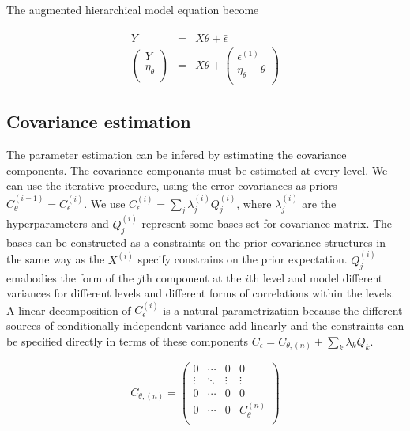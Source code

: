 \documentclass[final, paper=letter,5p,times,twocolumn]{elsarticle}
\theoremstyle{definition}
\begin{document}
The augmented hierarchical model equation become

\begin{equation}
  \left .
  \begin{array}{rcl}
    \bar{Y} & = & \bar{X}\theta + \bar{\epsilon} \\
    \left (
    \begin{array}{c}
      Y \\
      \eta_{\theta}  \\
    \end{array}
    \right ) & = & \bar{X}\theta + 
    \left (
    \begin{array}{c}
      \epsilon^{(1)} \\
      \eta_{\theta} - \theta  \\
    \end{array}
    \right )
  \end{array}
  \right .
  \label{hierarchical_augmented_model_recursive}
\end{equation}

\subsection{Covariance estimation}

The parameter estimation can be infered by estimating the covariance components. The covariance componants must be estimated at every level. We can use the iterative procedure, using the error covariances as priors $C_{\theta}^{(i-1)} = C_{\epsilon}^{(i)}$. We use $C_{\epsilon}^{(i)} = \sum_{j} \lambda_{j}^{(i)}Q_{j}^{(i)}$, where $\lambda_{j}^{(i)}$ are the hyperparameters and $Q_{j}^{(i)}$ represent some bases set for covariance matrix. The bases can be constructed as a constraints on the prior covariance structures in the same way as the $X^{(i)}$ specify constrains on the prior expectation. $Q_{j}^{(i)}$ emabodies the form of the $j$th component at the $i$th level and model different variances for different levels and different forms of correlations within the levels. A linear decomposition of $C_{\epsilon}^{(i)}$ is a natural parametrization because the different sources of conditionally independent variance add linearly and the constraints can be specified directly in terms of these components $C_{\epsilon} = C_{\theta,(n)} + \sum_{k} \lambda_{k}Q_{k}$.

\begin{equation}
  C_{\theta,(n)} =
  \left (
  \begin{array}{cccc}
    0 & \cdots & 0 & 0 \\
    \vdots & \ddots &\vdots & \vdots \\
    0 & \cdots & 0 & 0 \\
    0 & \cdots & 0 & C_{\theta}^{(n)} \\
  \end{array}
    \right )
  \label{C_theta_n}
\end{equation}
\end{document}
